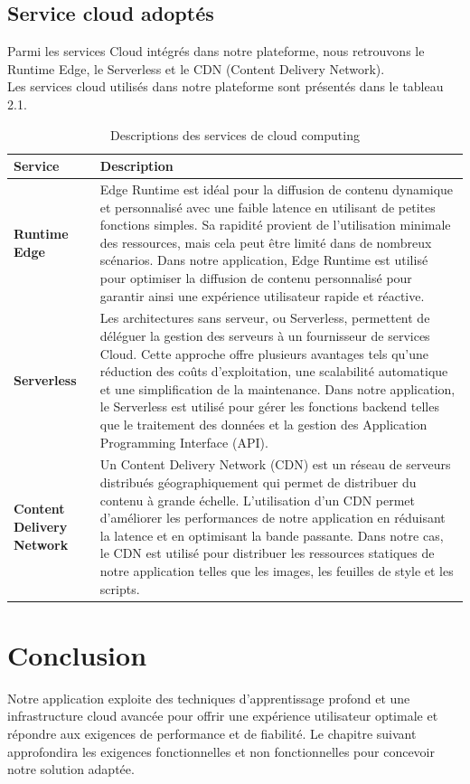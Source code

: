 \subsection{Service cloud adoptés }
\justifying
Parmi les services Cloud intégrés dans notre plateforme, nous retrouvons le Runtime Edge, le Serverless et le CDN (Content Delivery Network).\\
Les services cloud utilisés dans notre plateforme sont présentés dans le tableau 2.1.


\begin{table}[H]
    \centering
    \caption{Descriptions des services de cloud computing}
    \begin{tabular}{|>{\RaggedRight\arraybackslash}p{4cm}|>{\RaggedRight\arraybackslash}p{10cm}|}
        \hline
        \textbf{Service} & \textbf{Description} \\
        \hline
        \textbf{Runtime Edge} & Edge Runtime est idéal pour la diffusion de contenu dynamique et personnalisé avec une faible latence en utilisant de petites fonctions simples. Sa rapidité provient de l'utilisation minimale des ressources, mais cela peut être limité dans de nombreux scénarios. Dans notre application, Edge Runtime est utilisé pour optimiser la diffusion de contenu personnalisé pour garantir ainsi une expérience utilisateur rapide et réactive. \\
        \hline
        \textbf{Serverless} & Les architectures sans serveur, ou Serverless, permettent de déléguer la gestion des serveurs à un fournisseur de services Cloud. Cette approche offre plusieurs avantages tels qu'une réduction des coûts d'exploitation, une scalabilité automatique et une simplification de la maintenance. Dans notre application, le Serverless est utilisé pour gérer les fonctions backend telles que le traitement des données et la gestion des Application Programming Interface (API). \\
        \hline
        \textbf{Content Delivery Network} & Un Content Delivery Network (CDN) est un réseau de serveurs distribués géographiquement qui permet de distribuer du contenu à grande échelle. L'utilisation d'un CDN permet d'améliorer les performances de notre application en réduisant la latence et en optimisant la bande passante. Dans notre cas, le CDN est utilisé pour distribuer les ressources statiques de notre application telles que les images, les feuilles de style et les scripts. \\
        \hline
    \end{tabular}
    \label{table:cloud_services}
\end{table}

\section*{Conclusion}
\justifying
Notre application exploite des techniques d'apprentissage profond et une infrastructure cloud avancée pour offrir une expérience utilisateur optimale et répondre aux exigences de performance et de fiabilité. Le chapitre suivant approfondira les exigences fonctionnelles et non fonctionnelles pour concevoir notre solution adaptée.


